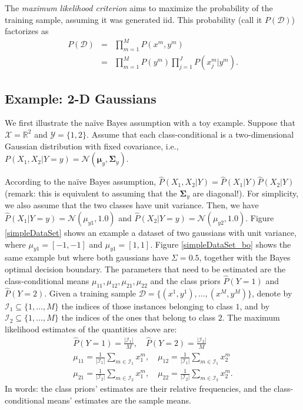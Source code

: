 The \emph{maximum likelihood criterion} 
aims to maximize the probability of the training sample, assuming it was generated iid. This probability (call it $P(\mathcal{D})$) factorizes as 
\begin{eqnarray}
P(\mathcal{D}) &=& \prod_{m=1}^M P(x^m,y^m) \nonumber\\
&=& \prod_{m=1}^M P(y^m)\prod_{j=1}^J P(x^m_j|y^m). 
\end{eqnarray}

\subsection{Example: 2-D Gaussians}

We first illustrate the na\"ive Bayes assumption with a toy example. 
Suppose that $\mathcal{X}=\mathbb{R}^2$ and $\mathcal{Y}=\{1,2\}$. 
Assume that each class-conditional is a two-dimensional Gaussian distribution with fixed covariance, 
i.e., $P(X_1,X_2|Y=y)=\mathcal{N}(\boldsymbol{\mu}_y, \boldsymbol{\Sigma}_y)$. 

According to the na\"ive Bayes assumption, ${\hat P}(X_1,X_2|Y) = {\hat P}(X_1|Y) {\hat P}(X_2|Y)$ (remark: this 
is equivalent to assuming that 
the $\boldsymbol{\Sigma}_y$ are diagonal!). For simplicity, we also assume that the two classes have unit variance. Then, we have 
${\hat P}(X_1|Y=y) = \mathcal{N}(\mu_{y1}, 1.0)$ 
and ${\hat P}(X_2|Y=y) = \mathcal{N}(\mu_{y2}, 1.0)$. Figure
\ref{simpleDataSet} shows an example a dataset of two gaussians with unit
variance, where $\mu_{y1} = [-1,-1]$ and $\mu_{y1} = [1,1]$. Figure
\ref{simpleDataSet_bo} shows the same example but where both
gaussians have $\Sigma = 0.5$, together with the Bayes optimal decision boundary. 
The parameters that need to be estimated are the class-conditional means $\mu_{11},\mu_{12},\mu_{21},\mu_{22}$ and 
the class priors ${\hat P}(Y=1)$ and ${\hat P}(Y=2)$. Given a training sample $\mathcal{D} = \{(x^{1},y^{1}),\ldots,(x^{M},y^{M})\}$, 
denote by $\mathcal{I}_1\subseteq \{1,\ldots,M\}$ the indices of those instances belonging to class $1$, and 
by $\mathcal{I}_2\subseteq \{1,\ldots,M\}$ the indices of the ones that belong to class $2$. 
The maximum likelihood estimates of the quantities above are: 
\begin{eqnarray}
{\hat P}(Y = 1) = \frac{|\mathcal{I}_1|}{M}, \quad 
{\hat P}(Y = 2) = \frac{|\mathcal{I}_2|}{M}\nonumber\\
\mu_{11} = \frac{1}{|\mathcal{I}_1|} \sum_{m \in \mathcal{I}_1} x_1^{m}, \quad
\mu_{12} = \frac{1}{|\mathcal{I}_1|} \sum_{m \in \mathcal{I}_1} x_2^{m}\nonumber\\
\mu_{21} = \frac{1}{|\mathcal{I}_2|} \sum_{m \in \mathcal{I}_2} x_1^{m}, \quad
\mu_{22} = \frac{1}{|\mathcal{I}_2|} \sum_{m \in \mathcal{I}_2} x_2^{m}.
\end{eqnarray}
In words: the class priors' estimates are their relative frequencies, and 
the class-conditional means' estimates are the sample means. 

